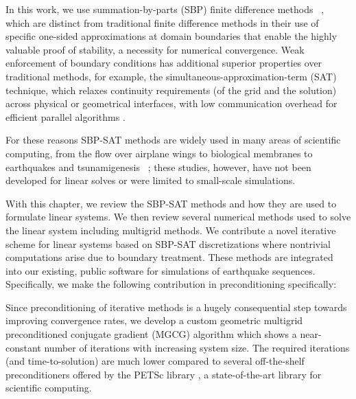 In this work, we use summation-by-parts (SBP) finite difference
methods ~\cite{KS74, Strand94, MN04, SVARD201417}, which are distinct from traditional finite difference
methods in their use of specific one-sided approximations at domain boundaries that enable the highly valuable proof of stability, a necessity for numerical convergence. Weak enforcement of boundary conditions has additional superior properties over traditional methods, for example, the simultaneous-approximation-term (SAT) technique, which relaxes continuity requirements (of the grid and the solution) across physical or geometrical interfaces, with low communication overhead for efficient parallel algorithms \cite{Fernandez2014}.

For these reasons SBP-SAT methods are widely used in many areas of scientific computing, from the flow over airplane wings to biological membranes to earthquakes and tsunamigenesis ~\cite{Ying2007, NordstromEriksson2010, Swim2011, petersson_stable, Lotto2015, EricksonDay2016}; these studies, however, have not been developed for linear solves or were limited to small-scale simulations. 


With this chapter, we review the SBP-SAT methods and how they are used to formulate linear systems.
We then review several numerical methods used to solve the linear system including multigrid methods.
We contribute a novel iterative scheme for linear systems based on SBP-SAT discretizations where nontrivial computations arise due to boundary treatment. These methods are integrated into our existing, public software for simulations of earthquake sequences. Specifically, we make the following contribution in preconditioning specifically:

Since preconditioning of iterative methods is a hugely consequential step towards improving convergence rates, we develop a custom geometric multigrid preconditioned conjugate gradient (MGCG) algorithm which shows a near-constant number of iterations with increasing system size. The required iterations (and time-to-solution) are much lower compared to several off-the-shelf preconditioners offered by the PETSc library \cite{petsc-web-page}, a state-of-the-art library for scientific computing.


